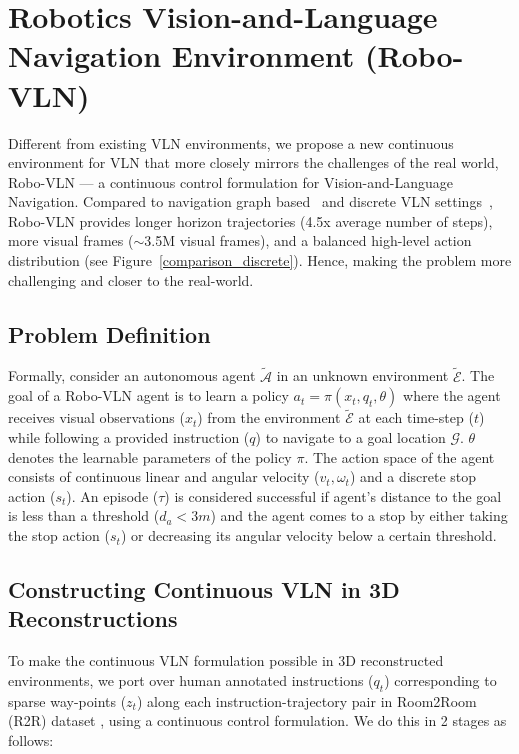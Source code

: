 \documentclass[letter, 10pt, conference]{ieeeconf}
\begin{document}
\section{Robotics Vision-and-Language Navigation Environment (Robo-VLN)}\label{robo-vln}

Different from existing VLN environments, we propose a new continuous environment for VLN that more closely mirrors the challenges of the real world, Robo-VLN --- a continuous control formulation for Vision-and-Language Navigation. 
Compared to navigation graph based~\cite{mattersim} and discrete VLN settings~\cite{krantz2020navgraph}, Robo-VLN provides longer horizon trajectories (4.5x average number of steps), more visual frames ($\sim$3.5M visual frames), and a balanced high-level action distribution (see Figure~\ref{comparison_discrete}). Hence, making the problem more challenging and closer to the real-world.

\subsection{Problem Definition}
Formally, consider an autonomous agent $\tilde{\mathcal A}$ in an unknown environment $\tilde{\mathcal E}$. 
The goal of a Robo-VLN agent is to learn a policy $a_{t} = \pi(x_{t}, q_{t}, \theta)$ where the agent receives visual observations ($x_{t}$) from the environment $\tilde{\mathcal E}$ at each time-step ($t$) while following a provided instruction ($q$) to navigate to a goal location $\mathcal G$. 
$\theta$ denotes the learnable parameters of the policy $\pi$. 
The action space of the agent consists of continuous linear and angular velocity ($v_{t}, \omega_{t}$) and a discrete stop action ($s_{t}$). 
An episode ($\tau$) is considered successful if agent's distance to the goal is less than a threshold ($d_{a}<3m$) and the agent comes to a stop by either taking the stop action ($s_{t}$) or decreasing its angular velocity below a certain threshold.

\subsection{Constructing Continuous VLN in 3D Reconstructions}
To make the continuous VLN formulation possible in 3D reconstructed environments, we port over human annotated instructions ($q_{t}$) corresponding to sparse way-points ($z_{t}$) along each instruction-trajectory pair in Room2Room (R2R) dataset \cite{mattersim}, using a continuous control formulation. We do this in 2 stages as follows: 
\end{document}
